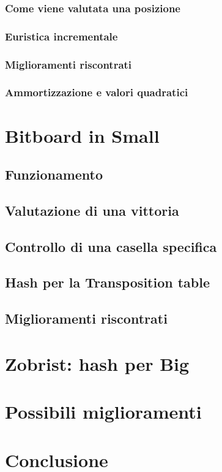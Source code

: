 \documentclass[a4paper]{article}
\begin{document}
\subsubsection{Come viene valutata una posizione}
\subsubsection{Euristica incrementale}
\subsubsection{Miglioramenti riscontrati}
\subsubsection{Ammortizzazione e valori quadratici}

\section{Bitboard in Small}
\label{sec_bitboard}
\subsection{Funzionamento}
\subsection{Valutazione di una vittoria}
\subsection{Controllo di una casella specifica}
\subsection{Hash per la Transposition table}
\subsection{Miglioramenti riscontrati}

\section{Zobrist: hash per Big}

\section{Possibili miglioramenti}
\section{Conclusione}
\end{document}
